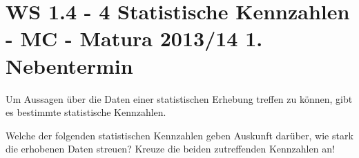 \section{WS 1.4 - 4 Statistische Kennzahlen - MC - Matura 2013/14 1. Nebentermin}

\begin{beispiel}[WS 1.4]{1} %
				Um Aussagen über die Daten einer statistischen Erhebung treffen zu können, gibt es bestimmte statistische Kennzahlen.

Welche der folgenden statistischen Kennzahlen geben Auskunft darüber, wie stark die erhobenen Daten streuen? Kreuze die beiden zutreffenden Kennzahlen an!\leer

\end{beispiel}
